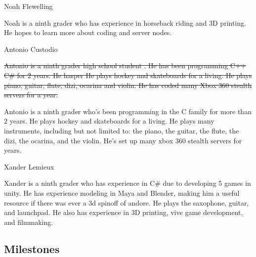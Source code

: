 \documentclass[11pt]{article}
\begin{document}
{\large {\color{orange}Noah Flewelling}}

Noah is a ninth grader who has experience in horseback riding and 3D printing. He hopes to learn more about coding and server nodes.

{\large {\color{orange} Antonio Custodio}}

\sout{
Antonio is a ninth grader high school student . He has been programming C++  C\# for 2 years. He hasper  He plays hockey  and skateboards for a living.  He plays piano, guitar, flute, dizi, ocarina and violin. He has coded many Xbox 360 stealth servers for a year.
}

Antonio is a ninth grader who's been programming in the C family for more than 2 years. He plays hockey and skateboards for a living. He plays many instruments, including but not limited to: the piano, the guitar, the flute, the dizi, the ocarina, and the violin. He’s set up many xbox 360 stealth servers for years.


{\large {\color{orange} Xander Lemieux}}

Xander is a ninth grader who has experience in C\# due to developing 5 games in unity. He has experience modeling in Maya and Blender, making him a useful resource if there was ever a 3d spinoff of andore. He plays the saxophone, guitar, and launchpad. He also has experience in 3D printing, vive game development, and filmmaking. 

\subsection{{\color{blue}Milestones}}
\end{document}
